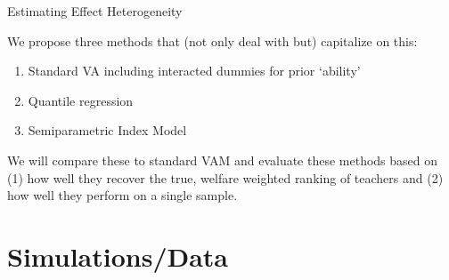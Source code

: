 \documentclass[11pt]{beamer}
\begin{document}

\begin{frame}{Estimating Effect Heterogeneity}

    We propose three methods that (not only deal with but) capitalize on this:
    
    \begin{enumerate}
        \item Standard VA including interacted dummies for prior `ability'
        \item Quantile regression
        \item Semiparametric Index Model
    \end{enumerate}
    
    We will compare these to standard VAM and evaluate these methods based on (1) how well they recover the true, welfare weighted ranking of teachers and (2) how well they perform on a single sample.
    
\end{frame}





\section{Simulations/Data}

\end{document}
